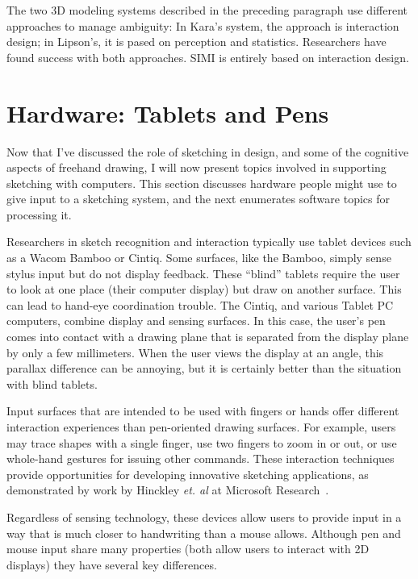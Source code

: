The two 3D modeling systems described in the preceding paragraph use
different approaches to manage ambiguity: In Kara's system, the
approach is interaction design; in Lipson's, it is pased on perception
and statistics. Researchers have found success with both
approaches. SIMI is entirely based on interaction design.



\cite{bloomenthal-sketch-n-make,mori-plushie,oh-fab,saul-sketch-chair,song-modelcraft}

\section{Hardware: Tablets and Pens}

Now that I've discussed the role of sketching in design, and some of
the cognitive aspects of freehand drawing, I will now present topics
involved in supporting sketching with computers. This section
discusses hardware people might use to give input to a sketching
system, and the next enumerates software topics for processing it.

Researchers in sketch recognition and interaction typically use tablet
devices such as a Wacom Bamboo or Cintiq. Some surfaces, like the
Bamboo, simply sense stylus input but do not display feedback. These
``blind'' tablets require the user to look at one place (their
computer display) but draw on another surface. This can lead to
hand-eye coordination trouble. The Cintiq, and various Tablet PC
computers, combine display and sensing surfaces. In this case, the
user's pen comes into contact with a drawing plane that is separated
from the display plane by only a few millimeters. When the user views
the display at an angle, this parallax difference can be annoying, but
it is certainly better than the situation with blind tablets.

Input surfaces that are intended to be used with fingers or hands
offer different interaction experiences than pen-oriented drawing
surfaces. For example, users may trace shapes with a single finger,
use two fingers to zoom in or out, or use whole-hand gestures for
issuing other commands. These interaction techniques provide
opportunities for developing innovative sketching applications, as
demonstrated by work by Hinckley \textit{et. al} at Microsoft
Research~\cite{hinckley-pen-touch}.

Regardless of sensing technology, these devices allow users to provide
input in a way that is much closer to handwriting than a mouse
allows. Although pen and mouse input share many properties (both allow
users to interact with 2D displays) they have several key differences.

